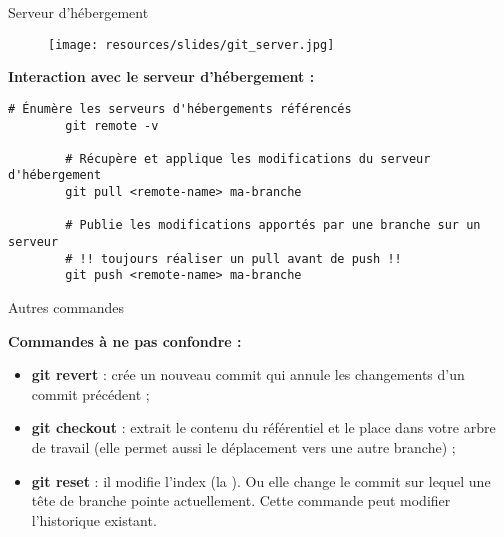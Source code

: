 \documentclass[9pt]{beamer}
\begin{document}
    \begin{frame}[fragile]{Serveur d'hébergement}

        \begin{figure}
            \texttt{[image: resources/slides/git\_server.jpg]}
        \end{figure}

        \pause
        \textbf{Interaction avec le serveur d'hébergement :}
        \begin{lstlisting}[style=custombash]
        # Énumère les serveurs d'hébergements référencés
        git remote -v

        # Récupère et applique les modifications du serveur d'hébergement
        git pull <remote-name> ma-branche

        # Publie les modifications apportés par une branche sur un serveur
        # !! toujours réaliser un pull avant de push !!
        git push <remote-name> ma-branche
        \end{lstlisting}
                
    \end{frame}

    \begin{frame}[fragile]{Autres commandes}

        \textbf{Commandes à ne pas confondre :}

        \begin{itemize}
            \item \textbf{git revert} : crée un nouveau commit qui annule les changements d'un commit précédent ;
            \item \textbf{git checkout} : extrait le contenu du référentiel et le place dans votre arbre de travail (elle permet aussi le déplacement vers une autre branche) ;
            \item \textbf{git reset} : il modifie l'index (la ). Ou elle change le commit sur lequel une tête de branche pointe actuellement. Cette commande peut modifier l'historique existant. 
        \end{itemize}

    \end{frame}
\end{document}

